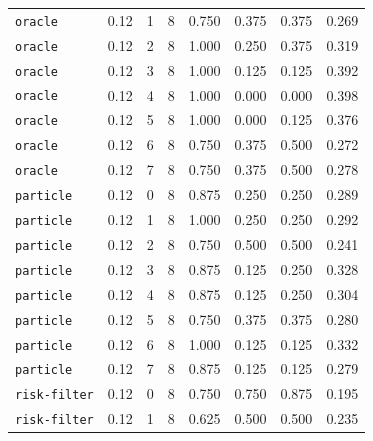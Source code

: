 \documentclass{article}
\begin{document}
\begin{center}
{\begin{tabular}{llllcccc}
\texttt{oracle} & 0.12 & 1 & 8 & 0.750 & 0.375 & 0.375 & 0.269 \\
\texttt{oracle} & 0.12 & 2 & 8 & 1.000 & 0.250 & 0.375 & 0.319 \\
\texttt{oracle} & 0.12 & 3 & 8 & 1.000 & 0.125 & 0.125 & 0.392 \\
\texttt{oracle} & 0.12 & 4 & 8 & 1.000 & 0.000 & 0.000 & 0.398 \\
\texttt{oracle} & 0.12 & 5 & 8 & 1.000 & 0.000 & 0.125 & 0.376 \\
\texttt{oracle} & 0.12 & 6 & 8 & 0.750 & 0.375 & 0.500 & 0.272 \\
\texttt{oracle} & 0.12 & 7 & 8 & 0.750 & 0.375 & 0.500 & 0.278 \\
\texttt{particle} & 0.12 & 0 & 8 & 0.875 & 0.250 & 0.250 & 0.289 \\
\texttt{particle} & 0.12 & 1 & 8 & 1.000 & 0.250 & 0.250 & 0.292 \\
\texttt{particle} & 0.12 & 2 & 8 & 0.750 & 0.500 & 0.500 & 0.241 \\
\texttt{particle} & 0.12 & 3 & 8 & 0.875 & 0.125 & 0.250 & 0.328 \\
\texttt{particle} & 0.12 & 4 & 8 & 0.875 & 0.125 & 0.250 & 0.304 \\
\texttt{particle} & 0.12 & 5 & 8 & 0.750 & 0.375 & 0.375 & 0.280 \\
\texttt{particle} & 0.12 & 6 & 8 & 1.000 & 0.125 & 0.125 & 0.332 \\
\texttt{particle} & 0.12 & 7 & 8 & 0.875 & 0.125 & 0.125 & 0.279 \\
\texttt{risk-filter} & 0.12 & 0 & 8 & 0.750 & 0.750 & 0.875 & 0.195 \\
\texttt{risk-filter} & 0.12 & 1 & 8 & 0.625 & 0.500 & 0.500 & 0.235 \\
\bottomrule
\end{tabular}%
}
\end{center}
\end{document}
